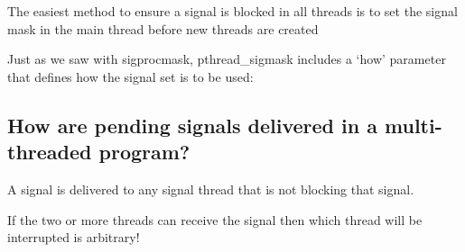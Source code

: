 The easiest method to ensure a signal is blocked in all threads is to
set the signal mask in the main thread before new threads are created

\begin{Shaded}
\begin{Highlighting}[]

\end{Highlighting}
\end{Shaded}

Just as we saw with sigprocmask, pthread\_sigmask includes a `how'
parameter that defines how the signal set is to be used:

\begin{Shaded}
\begin{Highlighting}[]
\end{Highlighting}
\end{Shaded}

\subsection{How are pending signals delivered in a multi-threaded
program?}\label{how-are-pending-signals-delivered-in-a-multi-threaded-program}

A signal is delivered to any signal thread that is not blocking that
signal.

If the two or more threads can receive the signal then which thread will
be interrupted is arbitrary!
